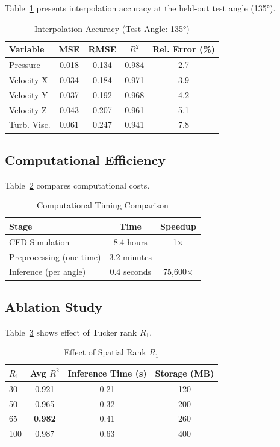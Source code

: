 \documentclass[conference]{IEEEtran}
\begin{document}
Table~\ref{tab:interpolation} presents interpolation accuracy at the held-out test angle (135°).

\begin{table}[h]
\centering
\caption{Interpolation Accuracy (Test Angle: 135°)}
\label{tab:interpolation}
\begin{tabular}{@{}lcccc@{}}
\toprule
Variable & MSE & RMSE & $R^2$ & Rel. Error (\%) \\
\midrule
Pressure & 0.018 & 0.134 & 0.984 & 2.7 \\
Velocity X & 0.034 & 0.184 & 0.971 & 3.9 \\
Velocity Y & 0.037 & 0.192 & 0.968 & 4.2 \\
Velocity Z & 0.043 & 0.207 & 0.961 & 5.1 \\
Turb. Visc. & 0.061 & 0.247 & 0.941 & 7.8 \\
\bottomrule
\end{tabular}
\end{table}

\subsection{Computational Efficiency}

Table~\ref{tab:timing} compares computational costs.

\begin{table}[h]
\centering
\caption{Computational Timing Comparison}
\label{tab:timing}
\begin{tabular}{@{}lcc@{}}
\toprule
Stage & Time & Speedup \\
\midrule
CFD Simulation & 8.4 hours & 1$\times$ \\
Preprocessing (one-time) & 3.2 minutes & -- \\
Inference (per angle) & 0.4 seconds & 75,600$\times$ \\
\bottomrule
\end{tabular}
\end{table}

\subsection{Ablation Study}

Table~\ref{tab:ablation} shows effect of Tucker rank $R_1$.

\begin{table}[h]
\centering
\caption{Effect of Spatial Rank $R_1$}
\label{tab:ablation}
\begin{tabular}{@{}lccc@{}}
\toprule
$R_1$ & Avg $R^2$ & Inference Time (s) & Storage (MB) \\
\midrule
30 & 0.921 & 0.21 & 120 \\
50 & 0.965 & 0.32 & 200 \\
65 & \textbf{0.982} & 0.41 & 260 \\
100 & 0.987 & 0.63 & 400 \\
\bottomrule
\end{tabular}
\end{table}
\end{document}

